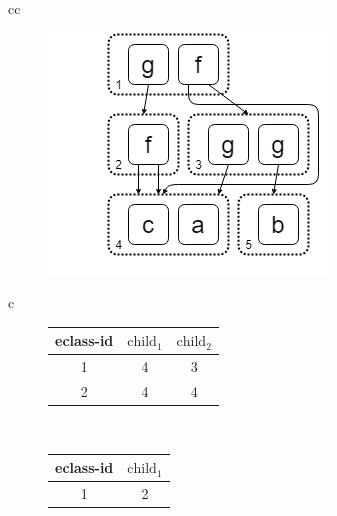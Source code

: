 \begin{figure}[!t]
    \hspace{-2em}
  \begin{tabular}[b]{cc}
    \begin{subfigure}[b]{0.45\linewidth}
        \includegraphics[width=\linewidth]{figures/egraph.png}
      \caption{}
      \label{fig:egraph}
    \end{subfigure}
    \begin{tabular}[b]{c}
      \begin{subfigure}[t]{0.45\columnwidth}
      \centering
        \begin{tabular}{|ccc|}
            \hline
            eclass-id & $\text{child}_1$ & $\text{child}_2$ \\
            \hline
            1         & 4        & 3        \\
            2         & 4        & 4       \\
            \hline
        \end{tabular}
        \caption{}
        \label{fig:repr-f}
      \end{subfigure}\\
      \begin{subfigure}[b]{0.5\columnwidth}
      \centering  
        \begin{tabular}{|cc|}
            \hline
            eclass-id & $\text{child}_1$ \\
            \hline
            1         & 2         \\

\end{tabular}
\end{subfigure}
\end{tabular}
\end{tabular}
\end{figure}
